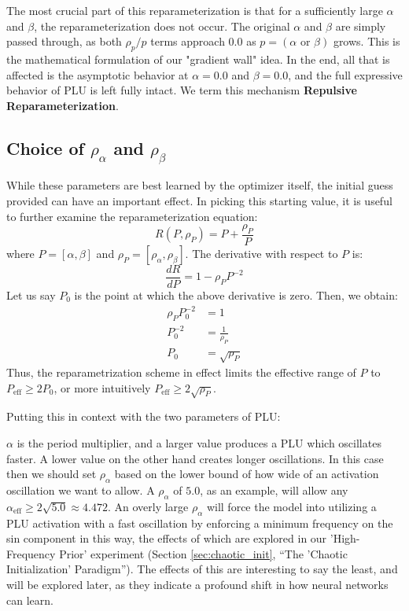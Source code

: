 \documentclass[11pt, letterpaper]{article}
\begin{document}
The most crucial part of this reparameterization is that for a sufficiently large $\alpha$ and $\beta$, the reparameterization does not occur. The original $\alpha$ and $\beta$ are simply passed through, as both $\rho_p / p$ terms approach $0.0$ as $p=(\alpha \text{ or } \beta)$ grows. This is the mathematical formulation of our "gradient wall" idea. In the end, all that is affected is the asymptotic behavior at $\alpha=0.0$ and $\beta=0.0$, and the full expressive behavior of PLU is left fully intact. We term this mechanism \textbf{Repulsive Reparameterization}.

\subsection{Choice of \texorpdfstring{$\rho_\alpha$ and $\rho_\beta$}{rho\_alpha and rho\_beta}}

While these parameters are best learned by the optimizer itself, the initial guess provided can have an important effect. In picking this starting value, it is useful to further examine the reparameterization equation:
\begin{equation}
    R(P, \rho_P) = P + \frac{\rho_P}{P}
    \label{eq:reparam}
\end{equation}
where $P = [\alpha, \beta]$ and $\rho_P = [\rho_\alpha, \rho_\beta]$.
The derivative with respect to $P$ is:
\begin{equation}
    \frac{dR}{dP} = 1 - \rho_P P^{-2}
\end{equation}
Let us say $P_0$ is the point at which the above derivative is zero. Then, we obtain:
\begin{align*}
    \rho_P P_0^{-2} &= 1 \\
    P_0^{-2} &= \frac{1}{\rho_P} \\
    P_0 &= \sqrt{\rho_P}
\end{align*}
Thus, the reparametrization scheme in effect limits the effective range of $P$ to $P_{\text{eff}} \ge 2 P_0$, or more intuitively $P_{\text{eff}} \ge 2 \sqrt{\rho_P}$.

Putting this in context with the two parameters of PLU:

$\alpha$ is the period multiplier, and a larger value produces a PLU which oscillates faster. A lower value on the other hand creates longer oscillations. In this case then we should set $\rho_\alpha$ based on the lower bound of how wide of an activation oscillation we want to allow. A $\rho_\alpha$ of $5.0$, as an example, will allow any $\alpha_{\text{eff}} \ge 2 \sqrt{5.0} \approx 4.472$. An overly large $\rho_\alpha$ will force the model into utilizing a PLU activation with a fast oscillation by enforcing a minimum frequency on the sin component in this way, the effects of which are explored in our 'High-Frequency Prior' experiment (Section \ref{sec:chaotic_init}, ``The 'Chaotic Initialization' Paradigm''). The effects of this are interesting to say the least, and will be explored later, as they indicate a profound shift in how neural networks can learn.
\end{document}
